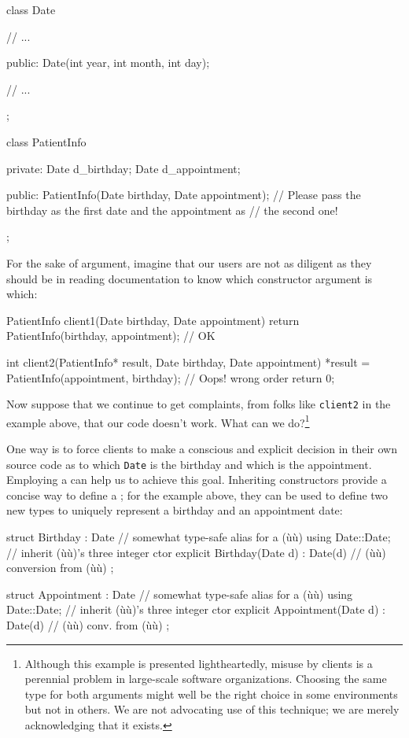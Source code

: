 \begin{emcppslisting}[language=C++]
class Date
{
    // ...

public:
    Date(int year, int month, int day);

    // ...
};

class PatientInfo
{
private:
    Date d_birthday;
    Date d_appointment;

public:
    PatientInfo(Date birthday, Date appointment);
        // Please pass the birthday as the first date and the appointment as
        // the second one!
};
\end{emcppslisting}
    
\noindent For the sake of argument, imagine that our users are not as diligent as
they should be in reading documentation to know which constructor
argument is which:

\begin{emcppslisting}[language=C++]
PatientInfo client1(Date birthday, Date appointment)
{
    return PatientInfo(birthday, appointment);  // OK
}

int client2(PatientInfo* result, Date birthday, Date appointment)
{
    *result = PatientInfo(appointment, birthday);  // Oops! wrong order
    return 0;
}
\end{emcppslisting}
    
\noindent Now suppose that we continue to get complaints, from folks like
\lstinline!client2! in the example above, that our code doesn't work. What can we
do?{\cprotect\footnote{Although this example is presented lightheartedly, misuse by clients is a perennial problem in large-scale
software organizations. Choosing the same type for both arguments
might well be the right choice in some environments but not in others.
We are not advocating use of this technique; we are merely
  acknowledging that it exists.}}

One way is to force clients to make a conscious and explicit decision in
their own source code as to which \lstinline!Date! is the birthday and
which is the appointment. Employing a 
can help us to achieve this goal. Inheriting constructors provide a
concise way to define a ; for
the example above, they can be used to define two new types to
 uniquely represent a birthday and an appointment date:

\begin{emcppslisting}[language=C++]
struct Birthday : Date  // somewhat type-safe alias for a (ù{}ù)
{
    using Date::Date;  // inherit (ù{}ù)'s three integer ctor
    explicit Birthday(Date d) : Date(d) { }  // (ù{}ù) conversion from (ù{}ù)
};

struct Appointment : Date  // somewhat type-safe alias for a (ù{}ù)
{
    using Date::Date;  // inherit (ù{}ù)'s three integer ctor
    explicit Appointment(Date d) : Date(d) { }  // (ù{}ù) conv. from (ù{}ù)
};
\end{emcppslisting}
    
